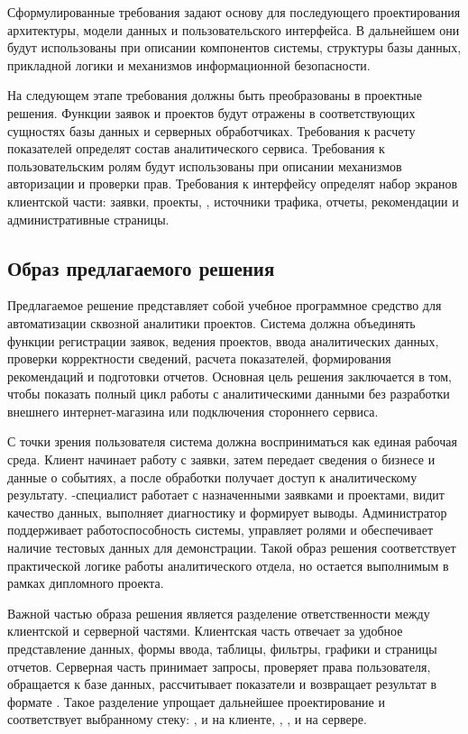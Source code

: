 Сформулированные требования задают основу для последующего проектирования архитектуры, модели данных и пользовательского интерфейса. В дальнейшем они будут использованы при описании компонентов системы, структуры базы данных, прикладной логики и механизмов информационной безопасности.

На следующем этапе требования должны быть преобразованы в проектные решения. Функции заявок и проектов будут отражены в соответствующих сущностях базы данных и серверных обработчиках. Требования к расчету показателей определят состав аналитического сервиса. Требования к пользовательским ролям будут использованы при описании механизмов авторизации и проверки прав. Требования к интерфейсу определят набор экранов клиентской части: заявки, проекты, , источники трафика, отчеты, рекомендации и административные страницы.

\subsection{Образ предлагаемого решения}

Предлагаемое решение представляет собой учебное программное средство для автоматизации сквозной аналитики  проектов. Система должна объединять функции регистрации заявок, ведения проектов, ввода аналитических данных, проверки корректности сведений, расчета показателей, формирования рекомендаций и подготовки отчетов. Основная цель решения заключается в том, чтобы показать полный цикл работы с аналитическими данными без разработки внешнего интернет-магазина или подключения стороннего сервиса.

С точки зрения пользователя система должна восприниматься как единая рабочая среда. Клиент начинает работу с заявки, затем передает сведения о бизнесе и данные о событиях, а после обработки получает доступ к аналитическому результату. -специалист работает с назначенными заявками и проектами, видит качество данных, выполняет диагностику и формирует выводы. Администратор поддерживает работоспособность системы, управляет ролями и обеспечивает наличие тестовых данных для демонстрации. Такой образ решения соответствует практической логике работы аналитического отдела, но остается выполнимым в рамках дипломного проекта.

Важной частью образа решения является разделение ответственности между клиентской и серверной частями. Клиентская часть отвечает за удобное представление данных, формы ввода, таблицы, фильтры, графики и страницы отчетов. Серверная часть принимает запросы, проверяет права пользователя, обращается к базе данных, рассчитывает показатели и возвращает результат в формате . Такое разделение упрощает дальнейшее проектирование и соответствует выбранному стеку: ,  и  на клиенте, , ,  и  на сервере.

